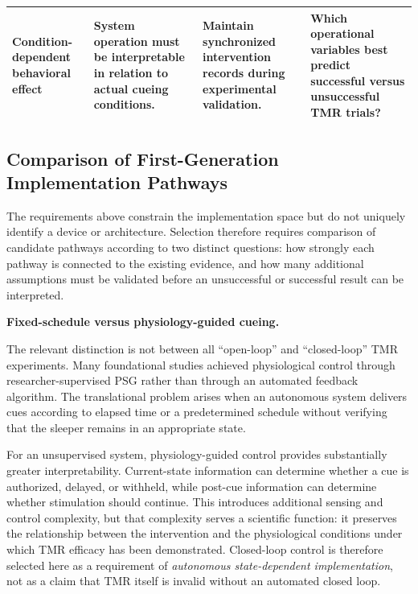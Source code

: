 \begin{table}[t]
\begin{tabularx}{\textwidth}{
@{}
>{\raggedright\arraybackslash}p{2.7cm}
>{\raggedright\arraybackslash}X
>{\raggedright\arraybackslash}X
>{\raggedright\arraybackslash}X
@{}
}
\addlinespace[1.2mm]

\textbf{Condition-dependent behavioral effect}
&
System operation must be interpretable in relation to actual cueing conditions.
&
Maintain synchronized intervention records during experimental validation.
&
Which operational variables best predict successful versus unsuccessful TMR
trials?
\\

\bottomrule

\end{tabularx}

\end{table}


\subsection{Comparison of First-Generation Implementation Pathways}

The requirements above constrain the implementation space but do not uniquely
identify a device or architecture. Selection therefore requires comparison of
candidate pathways according to two distinct questions: how strongly each
pathway is connected to the existing evidence, and how many additional
assumptions must be validated before an unsuccessful or successful result can
be interpreted.

\noindent\textbf{Fixed-schedule versus physiology-guided cueing.}

The relevant distinction is not between all ``open-loop'' and ``closed-loop''
TMR experiments. Many foundational studies achieved physiological control
through researcher-supervised PSG rather than through an automated feedback
algorithm. The translational problem arises when an autonomous system delivers
cues according to elapsed time or a predetermined schedule without verifying
that the sleeper remains in an appropriate state.

For an unsupervised system, physiology-guided control provides substantially
greater interpretability. Current-state information can determine whether a cue
is authorized, delayed, or withheld, while post-cue information can determine
whether stimulation should continue. This introduces additional sensing and
control complexity, but that complexity serves a scientific function: it
preserves the relationship between the intervention and the physiological
conditions under which TMR efficacy has been demonstrated. Closed-loop control
is therefore selected here as a requirement of \textit{autonomous
state-dependent implementation}, not as a claim that TMR itself is invalid
without an automated closed loop.


